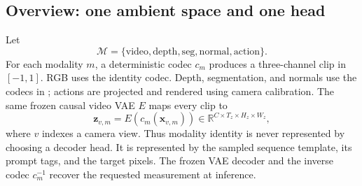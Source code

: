 \documentclass{article}
\newcommand{\modalities}{\mathcal{M}}
\begin{document}
\subsection{Overview: one ambient space and one head}

Let
\begin{equation}
\modalities=\{\mathrm{video},\mathrm{depth},\mathrm{seg},\mathrm{normal},\mathrm{action}\}.
\label{eq:modalities}
\end{equation}
For each modality $m$, a deterministic codec $c_m$ produces a three-channel clip in
$[-1,1]$. RGB uses the identity codec. Depth, segmentation, and normals use the codecs in
; actions are projected and rendered using camera calibration. The same
frozen causal video VAE $E$ maps every clip to
\begin{equation}
  \mathbf{z}_{v,m}=E\!\left(c_m(\mathbf{x}_{v,m})\right)
  \in\mathbb{R}^{C\times T_z\times H_z\times W_z},
\label{eq:sharedvae}
\end{equation}
where $v$ indexes a camera view. Thus modality identity is never represented by choosing a
decoder head. It is represented by the sampled sequence template, its prompt tags, and the
target pixels. The frozen VAE decoder and the inverse codec $c_m^{-1}$ recover the requested
measurement at inference.
\end{document}
